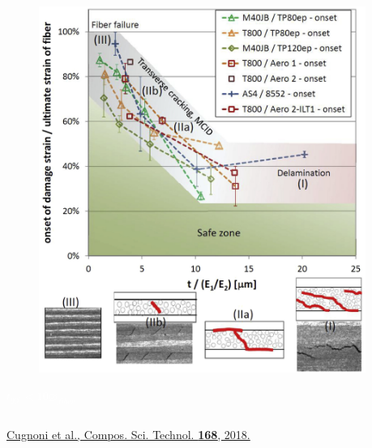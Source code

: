 \documentclass[first,firstsupp,lastsupp,last,hyperref,table]{ETHclass}
\begin{document}
\begin{frame}
\begin{columns}[t]
\begin{column}{0.5\textwidth}
\end{column}
\end{columns}
\vspace{-0.4cm}
\begin{columns}[c]
\begin{column}{0.5\textwidth}
\begin{figure}
\centering
\includegraphics[width=0.9\columnwidth]{thinply-plythicknesseffect.jpg}
\end{figure}
\vspace{-0.6cm}
\centering
\textcolor{white}{\tiny$t_{90^{\circ}}<10\diameter_{fiber}$}
\end{column}
\begin{column}{0.5\textwidth}
\centering
\end{column}
\end{columns}
\vspace{0.15cm}
\begin{columns}[b]
\begin{column}{0.5\textwidth}
\centering
\pgfmathsetmacro{}
\pgfmathsetmacro{}
{\fontsize{\fontsizeref}{\stretchref} \selectfont \href{https://doi.org/10.1016/j.compscitech.2018.08.037}{Cugnoni et al., Compos. Sci. Technol. \textbf{168}, 2018.}}
\end{column}
\begin{column}{0.5\textwidth}
\centering
\end{column}
\end{columns}
\end{frame}
\end{document}
